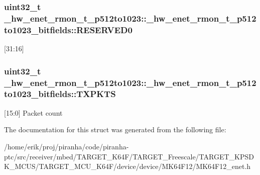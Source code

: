\subsubsection[{\texorpdfstring{R\+E\+S\+E\+R\+V\+E\+D0}{RESERVED0}}]{\setlength{\rightskip}{0pt plus 5cm}uint32\+\_\+t \+\_\+hw\+\_\+enet\+\_\+rmon\+\_\+t\+\_\+p512to1023\+::\+\_\+hw\+\_\+enet\+\_\+rmon\+\_\+t\+\_\+p512to1023\+\_\+bitfields\+::\+R\+E\+S\+E\+R\+V\+E\+D0}\hypertarget{struct__hw__enet__rmon__t__p512to1023_1_1__hw__enet__rmon__t__p512to1023__bitfields_ac2e43b871b85fc92da0f67cf3619f02a}{}\label{struct__hw__enet__rmon__t__p512to1023_1_1__hw__enet__rmon__t__p512to1023__bitfields_ac2e43b871b85fc92da0f67cf3619f02a}
\mbox{[}31\+:16\mbox{]} 
\subsubsection[{\texorpdfstring{T\+X\+P\+K\+TS}{TXPKTS}}]{\setlength{\rightskip}{0pt plus 5cm}uint32\+\_\+t \+\_\+hw\+\_\+enet\+\_\+rmon\+\_\+t\+\_\+p512to1023\+::\+\_\+hw\+\_\+enet\+\_\+rmon\+\_\+t\+\_\+p512to1023\+\_\+bitfields\+::\+T\+X\+P\+K\+TS}\hypertarget{struct__hw__enet__rmon__t__p512to1023_1_1__hw__enet__rmon__t__p512to1023__bitfields_a93c410ba96bdfc84016265192ebee992}{}\label{struct__hw__enet__rmon__t__p512to1023_1_1__hw__enet__rmon__t__p512to1023__bitfields_a93c410ba96bdfc84016265192ebee992}
\mbox{[}15\+:0\mbox{]} Packet count 

The documentation for this struct was generated from the following file\+:\begin{DoxyCompactItemize}
\item 
/home/erik/proj/piranha/code/piranha-\/ptc/src/receiver/mbed/\+T\+A\+R\+G\+E\+T\+\_\+\+K64\+F/\+T\+A\+R\+G\+E\+T\+\_\+\+Freescale/\+T\+A\+R\+G\+E\+T\+\_\+\+K\+P\+S\+D\+K\+\_\+\+M\+C\+U\+S/\+T\+A\+R\+G\+E\+T\+\_\+\+M\+C\+U\+\_\+\+K64\+F/device/device/\+M\+K64\+F12/M\+K64\+F12\+\_\+enet.\+h\end{DoxyCompactItemize}
